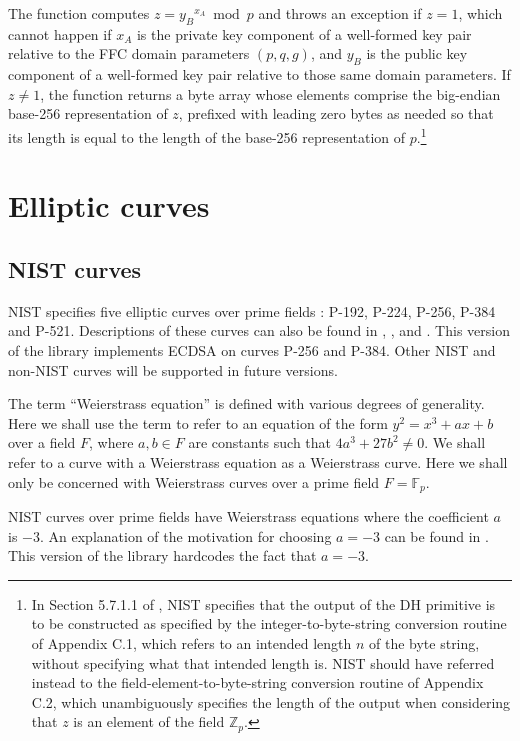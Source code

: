 \documentclass[12pt]{article}
\begin{document}
The function computes $z = {y_B}^{x_A} \bmod p$ and throws an exception if $z=1$, which cannot happen if $x_A$ is the private key component of a well-formed key pair relative to 
the FFC domain parameters $(p,q,g)$,
and $y_B$ is the public key component of a well-formed key pair relative to those same domain parameters.
If $z \not= 1$, the function returns a byte array whose elements comprise the big-endian base-256 representation
of $z$, prefixed with leading zero bytes as needed so that its length is equal to the length 
of the base-256 representation of $p$.\footnote{In Section 5.7.1.1 of \cite{NIST-DH}, NIST specifies
that the output of the DH primitive is to be constructed as specified by the integer-to-byte-string
conversion routine of Appendix C.1, which refers to an intended length $n$ of the byte string, without
specifying what that intended length is.  NIST should have referred instead to the 
field-element-to-byte-string conversion routine of Appendix C.2, which unambiguously specifies
the length of the output when considering that $z$ is an element of the field $\mathbb{Z}_p$.}

\section{Elliptic curves}

\subsection{NIST curves}

NIST specifies five elliptic curves
over prime fields \cite[\S~D.2]{DSS-4}: P-192, P-224, P-256, P-384 and
P-521.  Descriptions of these curves can also be found in
\cite[\S 10.2]{ECDSACerticom}, \cite{ECC-NSA}, \cite{NISTCurves} and \cite{X9.62}.  This version of
the library implements ECDSA on curves P-256 and P-384.  Other NIST
and non-NIST curves will be supported in future versions.

The term ``Weierstrass equation'' is defined with various degrees of
generality.  Here we shall use the term to refer to an equation of the
form $y^2 = x^3 + ax + b$ over a field $F$, where $a,b\in F$ are
constants such that $4a^3+27b^2\not=0$.  We shall refer to a curve
with a Weierstrass equation as a Weierstrass curve.  Here we shall
only be concerned with Weierstrass curves over a prime field
$F=\mathbb{F}_p$.

NIST curves over prime fields have Weierstrass equations where the
coefficient $a$ is $-3$.  An explanation of the motivation for
choosing $a=-3$ can be found in
\cite[\S~2.6.2]{washington2003elliptic}.  This version of the library
hardcodes the fact that $a = -3$.
\end{document}
